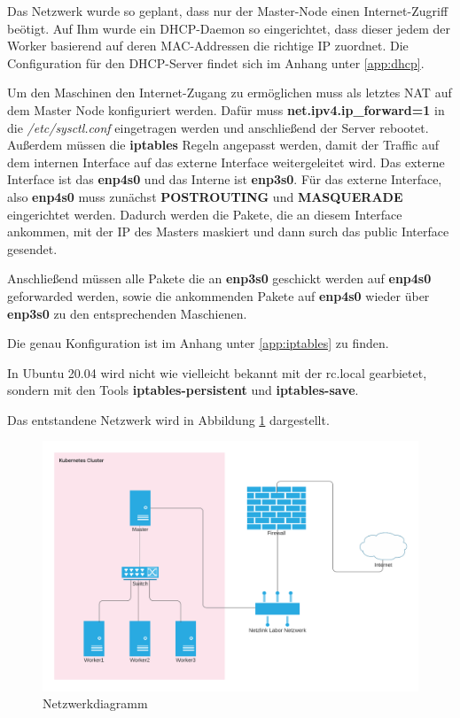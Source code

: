 Das Netzwerk wurde so geplant, dass nur der Master-Node einen Internet-Zugriff beötigt.
Auf Ihm wurde ein \ac{DHCP}-Daemon so eingerichtet, dass dieser jedem der Worker basierend auf deren \ac{MAC}-Addressen die richtige IP zuordnet. 
Die Configuration für den \ac{DHCP}-Server findet sich im Anhang unter \ref{app:dhcp}. 

Um den Maschinen den Internet-Zugang zu ermöglichen muss als letztes \ac{NAT} auf dem Master Node konfiguriert werden.
Dafür muss \textbf{net.ipv4.ip\_forward=1} in die \textit{/etc/sysctl.conf} eingetragen werden und anschließend der Server rebootet.
Außerdem müssen die \textbf{iptables} Regeln angepasst werden, damit der Traffic auf dem internen Interface auf das externe Interface weitergeleitet wird. 
Das externe Interface ist das \textbf{enp4s0} und das Interne ist \textbf{enp3s0}.
Für das externe Interface, also \textbf{enp4s0} muss zunächst \textbf{POSTROUTING} und \textbf{MASQUERADE} eingerichtet werden. 
Dadurch werden die Pakete, die an diesem Interface ankommen, mit der IP des Masters maskiert und dann surch das public Interface gesendet. 

Anschließend müssen alle Pakete die an \textbf{enp3s0} geschickt werden auf \textbf{enp4s0} geforwarded werden, sowie die ankommenden Pakete auf \textbf{enp4s0} wieder über \textbf{enp3s0} zu den entsprechenden Maschienen.

Die genau Konfiguration ist im Anhang unter \ref{app:iptables} zu finden. 

In Ubuntu 20.04 wird nicht wie vielleicht bekannt mit der rc.local gearbietet, sondern mit den Tools \textbf{iptables-persistent} und \textbf{iptables-save}.

Das entstandene Netzwerk wird in Abbildung \ref{fig:network_diagramm} dargestellt.

\begin{figure}[h]
    \centering
    \includegraphics[width=\textwidth]{bilder/Katanetes Network.png}
    \caption{Netzwerkdiagramm}
    \label{fig:network_diagramm}
\end{figure}

